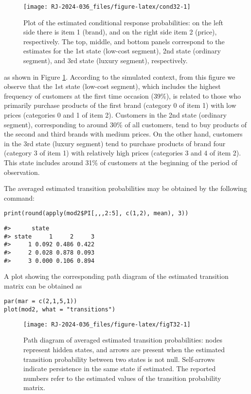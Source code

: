 \begin{figure}

{\centering \texttt{[image: RJ-2024-036\_files/figure-latex/cond32-1]} 

}

\caption{Plot of the estimated conditional response probabilities: on the left side there is item 1 (brand), and on the right side item 2 (price), respectively. The top, middle, and bottom panels correspond to the estimates for the 1st state (low-cost segment), 2nd state (ordinary segment), and 3rd state (luxury segment), respectively.}\label{fig:cond32}
\end{figure}

\noindent as shown in Figure \ref{fig:cond32}. According to the simulated context, from this figure we observe that the 1st state (low-cost segment), which includes the highest frequency of customers at
the first time occasion (39\%), is related to those who primarily
purchase products of the first brand (category 0 of item 1) with low
prices (categories 0 and 1 of item 2). Customers in the 2nd state
(ordinary segment), corresponding to around 30\% of all customers, tend
to buy products of the second and third brands with medium prices. On
the other hand, customers in the 3rd state (luxury segment) tend to
purchase products of brand four (category 3 of item 1) with relatively
high prices (categories 3 and 4 of item 2). This state includes around
31\% of customers at the beginning of the period of observation.

The averaged estimated transition probabilities may be obtained by the
following command:

\begin{verbatim}
print(round(apply(mod2$PI[,,,2:5], c(1,2), mean), 3))
\end{verbatim}

\begin{verbatim}
#>      state
#> state     1     2     3
#>     1 0.092 0.486 0.422
#>     2 0.028 0.878 0.093
#>     3 0.000 0.106 0.894
\end{verbatim}

A plot showing the corresponding path diagram of the estimated
transition matrix can be obtained as

\begin{verbatim}
par(mar = c(2,1,5,1))
plot(mod2, what = "transitions")
\end{verbatim}

\begin{figure}

{\centering \texttt{[image: RJ-2024-036\_files/figure-latex/figT32-1]} 

}

\caption{Path diagram of averaged estimated transition probabilities: nodes represent hidden states, and arrows are present when the estimated transition probability between two states is not null. Self-arrows indicate persistence in the same state if estimated. The reported numbers refer to the estimated values of the transition probability matrix.}\label{fig:figT32}
\end{figure}

